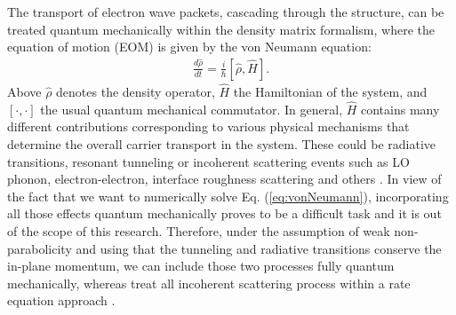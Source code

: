 \documentclass[twocolumn,secnumarabic,amssymb, nobibnotes, aps, prd]{revtex4-1}
\begin{document}
The transport of electron wave packets, cascading through the structure, can be treated quantum mechanically within the density matrix formalism, where the equation of motion (EOM) is given by the von Neumann equation:
\begin{align}
\label{eq:vonNeumann}
\frac{d \hat{\rho}}{dt} =\frac{i}{\hbar}[\hat{\rho},\hat{H}].
\end{align}
Above $\hat{\rho}$ denotes the density operator, $\hat{H}$ the Hamiltonian of the system, and $[\cdot,\cdot]$ the usual quantum mechanical commutator. In general, $\hat{H}$ contains many different contributions corresponding to various physical mechanisms that determine the overall carrier transport in the system. These could be radiative transitions, resonant tunneling or incoherent scattering events such as LO phonon, electron-electron, interface roughness scattering and others \cite{jirauschek2014modeling}. In view of the fact that we want to numerically solve Eq. (\ref{eq:vonNeumann}), incorporating all those effects quantum mechanically proves to be a difficult task and it is out of the scope of this research. Therefore, under the assumption of weak non-parabolicity and using that the tunneling and radiative transitions conserve the in-plane momentum, we can include those two processes fully quantum mechanically, whereas treat all incoherent scattering process within a rate equation approach \cite{jirauschek2014modeling,iotti2005microscopic}. 
\end{document}
